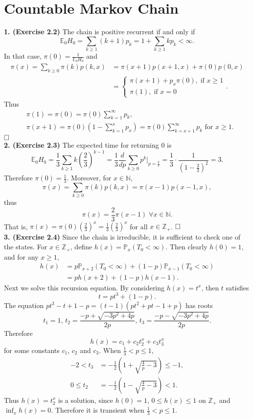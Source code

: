 \documentclass[12pt]{extarticle}
\begin{document}
\newpage
\section*{Countable Markov Chain}
\textbf{1. (Exercise 2.2)}
The chain is positive recurrent if and only if
\[
\mathbb{E}_0H_0=\sum_{k\geq 1}
(k+1)p_k
=1+\sum_{k\geq 1}kp_k<\infty.
\]
In that case, $\pi(0)=\frac{1}{\mathbb{E}_0H_0}$ and
\[
\begin{aligned}
\pi(x)=\sum_{k\geq 0}\pi(k)p(k,x)
&=
\pi(x+1)p(x+1,x)+\pi(0)p(0,x) \\&
=\left\{
\begin{array}{ll}
\pi(x+1)+p_x\pi(0),\;\text{if $x\geq 1$} \\
\pi(1),\;\text{if $x=0$}
\end{array}.
\right.
\end{aligned}
\]
Thus
\[
\begin{aligned}
&\pi(1)=\pi(0)=\pi(0)\sum_{k=1}^\infty p_k, \\&
\pi(x+1)=\pi(0)\left(1-\sum_{k=1}^xp_x\right)=\pi(0)\sum_{k=x+1}^\infty p_k\text{ for $x\geq 1$}.
\end{aligned}
\]
$\hspace{\fill}\square$ \\

\noindent
\textbf{2. (Exercise 2.3)}
The expected time for returning 0 is
\[
\mathbb{E}_0H_0=\frac{1}{3}\sum_{k\geq 1}
k\left(\frac{2}{3}\right)^{k-1}
=
\frac{1}{3}\frac{d}{dp}
\sum_{k\geq 0}p^k\Big|_{p=\frac{2}{3}}
=
\frac{1}{3}\cdot\frac{1}{(1-\frac{2}{3})^2}=3.
\]
Therefore
$\pi(0)=\frac{1}{3}$.
Moreover, for $x\in\mathbb{N}$,
\[
\pi(x)=\sum_{k\geq 0}\pi(k)p(k,x)
=
\pi(x-1)p(x-1,x),
\]
thus
\[
\pi(x)=\frac{2}{3}\pi(x-1)\;\forall x\in\mathbb{N}.
\]
That is, $\pi(x)=\pi(0)\left(\frac{2}{3}\right)^x=\frac{1}{3}\left(\frac{2}{3}\right)^x$ for all $x\in\mathbb{Z}_+$.
$\hspace{\fill}\square$ \\

\noindent
\textbf{3. (Exercise 2.4)} Since the chain is irreducible, it is sufficient to check one of the states.
For $x\in\mathbb{Z}_+$,
define $h(x)=\mathbb{P}_x(T_0<\infty)$.
Then clearly $h(0)=1$, and for any $x\geq 1$,
\[
\begin{aligned}
h(x)&=p\mathbb{P}_{x+2}(T_0<\infty)+(1-p)\mathbb{P}_{x-1}(T_0<\infty) \\&
=
ph(x+2)+(1-p)h(x-1).
\end{aligned}
\]
Next we solve this recursion equation.
By considering $h(x)=t^x$,
then $t$ satisfies
\[
t=pt^3+(1-p).
\]
The equation $pt^3-t+1-p=(t-1)(pt^2+pt-1+p)$ has roots
\[
t_1=1,\,t_2=\frac{-p+\sqrt{-3p^2+4p}}{2p},\,
t_3=\frac{-p-\sqrt{-3p^2+4p}}{2p}.
\]
Therefore
\[
h(x)=c_1+c_2t_2^x+c_3t_3^x
\]
for some constants $c_1$, $c_2$ and $c_3$.
When $\frac{1}{3}<p\leq 1$,
\[
\begin{aligned}
-2<
t_3&=-\frac{1}{2}\left(1+\sqrt{\frac{4}{p}-3}\right)
\leq -1, \\
0
\leq
t_2&=-\frac{1}{2}\left(1-\sqrt{\frac{4}{p}-3}\right)
<1.
\end{aligned}
\]
Thus $h(x)=t_2^x$ is a solution, since $h(0)=1$, $0\leq h(x)\leq 1$ on $\mathbb{Z}_+$ and $\inf_xh(x)=0$.
Therefore it is transient when $\frac{1}{3}<p\leq 1$.
\end{document}
